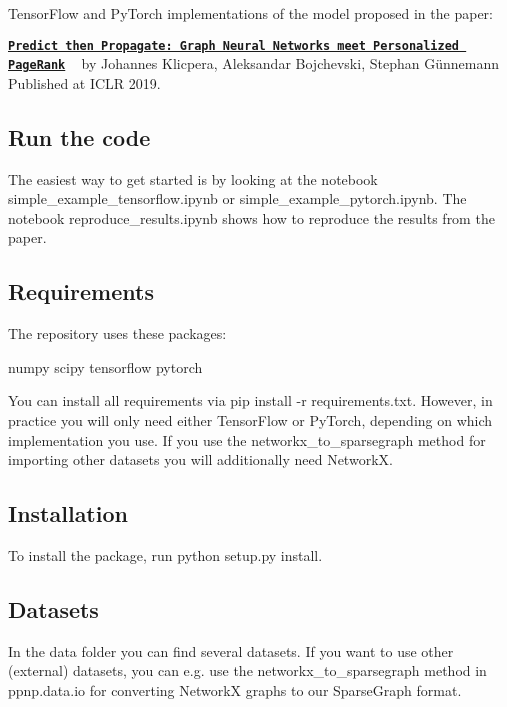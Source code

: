  

Tensor\+Flow and Py\+Torch implementations of the model proposed in the paper\+:

{\bfseries \href{https://www.kdd.in.tum.de/ppnp}{\tt Predict then Propagate\+: Graph Neural Networks meet Personalized Page\+Rank}} ~\newline
by Johannes Klicpera, Aleksandar Bojchevski, Stephan Günnemann ~\newline
Published at I\+C\+LR 2019.

\subsection*{Run the code}

The easiest way to get started is by looking at the notebook {\ttfamily simple\+\_\+example\+\_\+tensorflow.\+ipynb} or {\ttfamily simple\+\_\+example\+\_\+pytorch.\+ipynb}. The notebook {\ttfamily reproduce\+\_\+results.\+ipynb} shows how to reproduce the results from the paper.

\subsection*{Requirements}

The repository uses these packages\+:


\begin{DoxyCode}
numpy
scipy
tensorflow
pytorch
\end{DoxyCode}


You can install all requirements via {\ttfamily pip install -\/r requirements.\+txt}. However, in practice you will only need either Tensor\+Flow or Py\+Torch, depending on which implementation you use. If you use the {\ttfamily networkx\+\_\+to\+\_\+sparsegraph} method for importing other datasets you will additionally need NetworkX.

\subsection*{Installation}

To install the package, run {\ttfamily python setup.\+py install}.

\subsection*{Datasets}

In the {\ttfamily data} folder you can find several datasets. If you want to use other (external) datasets, you can e.\+g. use the {\ttfamily networkx\+\_\+to\+\_\+sparsegraph} method in {\ttfamily ppnp.\+data.\+io} for converting NetworkX graphs to our Sparse\+Graph format.

